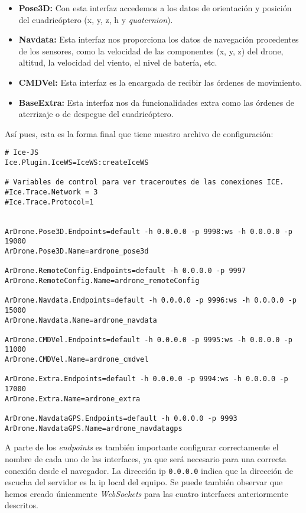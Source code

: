 \begin{itemize}
\item \textbf{Pose3D:} Con esta interfaz accedemos a los datos de orientación y posición del cuadricóptero (x, y, z, h y \emph{quaternion}).
\item \textbf{Navdata:} Esta interfaz nos proporciona los datos de navegación procedentes de los sensores, como la velocidad de las componentes (x, y, z) del drone, altitud, la velocidad del viento, el nivel de batería, etc.
\item \textbf{CMDVel:} Esta interfaz es la encargada de recibir las órdenes de movimiento.
\item \textbf{BaseExtra:} Esta interfaz nos da funcionalidades extra como las órdenes de aterrizaje o de despegue del cuadricóptero.
\end{itemize}

Así pues, esta es la forma final que tiene nuestro archivo de configuración:\\

\begin{lstlisting}[caption=Archivo de configuración de ArDrone\_Server.]
# Ice-JS
Ice.Plugin.IceWS=IceWS:createIceWS

# Variables de control para ver traceroutes de las conexiones ICE.
#Ice.Trace.Network = 3
#Ice.Trace.Protocol=1


ArDrone.Pose3D.Endpoints=default -h 0.0.0.0 -p 9998:ws -h 0.0.0.0 -p 19000
ArDrone.Pose3D.Name=ardrone_pose3d

ArDrone.RemoteConfig.Endpoints=default -h 0.0.0.0 -p 9997
ArDrone.RemoteConfig.Name=ardrone_remoteConfig

ArDrone.Navdata.Endpoints=default -h 0.0.0.0 -p 9996:ws -h 0.0.0.0 -p 15000
ArDrone.Navdata.Name=ardrone_navdata

ArDrone.CMDVel.Endpoints=default -h 0.0.0.0 -p 9995:ws -h 0.0.0.0 -p 11000
ArDrone.CMDVel.Name=ardrone_cmdvel

ArDrone.Extra.Endpoints=default -h 0.0.0.0 -p 9994:ws -h 0.0.0.0 -p 17000
ArDrone.Extra.Name=ardrone_extra

ArDrone.NavdataGPS.Endpoints=default -h 0.0.0.0 -p 9993
ArDrone.NavdataGPS.Name=ardrone_navdatagps
\end{lstlisting}

A parte de los \emph{endpoints} es también importante configurar correctamente el nombre de cada uno de las interfaces, ya que será necesario para una correcta conexión desde el navegador. La dirección ip \texttt{0.0.0.0} indica que la dirección de escucha del servidor es la ip local del equipo. Se puede también observar que hemos creado únicamente \emph{WebSockets} para las cuatro interfaces anteriormente descritos.\\


